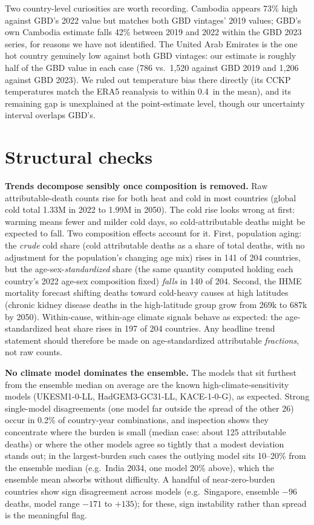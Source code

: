 \documentclass[11pt]{ozreport}
\begin{document}
Two country-level curiosities are worth recording. Cambodia appears 73\%
high against GBD's 2022 value but matches both GBD vintages' 2019 values;
GBD's own Cambodia estimate falls 42\% between 2019 and 2022 within the
GBD 2023 series, for reasons we have not identified. The United Arab
Emirates is the one hot country genuinely low against both GBD vintages:
our estimate is roughly half of the GBD value in each case (786 vs.\ 1{,}520
against GBD 2019 and 1{,}206 against GBD 2023). We ruled out temperature
bias there directly (its CCKP temperatures match the ERA5 reanalysis to
within 0.4\,\textcelsius{} in the mean), and its remaining gap is
unexplained at the point-estimate level, though our uncertainty interval
overlaps GBD's.

\section{Structural checks}

\textbf{Trends decompose sensibly once composition is removed.} Raw
attributable-death counts rise for both heat and cold in most countries
(global cold total 1.33M in 2022 to 1.99M in 2050). The cold rise looks
wrong at first: warming means fewer and milder cold days, so
cold-attributable deaths might be expected to fall. Two composition effects
account for it. First, population aging: the \emph{crude} cold share (cold
attributable deaths as a share of total deaths, with no adjustment for the
population's changing age mix) rises in 141 of 204 countries, but the
age-sex-\emph{standardized} share (the same quantity computed holding each
country's 2022 age-sex composition fixed) \emph{falls} in 140 of 204.
Second, the IHME mortality
forecast shifting deaths toward cold-heavy causes at high latitudes (chronic
kidney disease deaths in the high-latitude group grow from 269k to 687k by
2050). Within-cause, within-age climate signals behave as expected: the
age-standardized heat share rises in 197 of 204 countries. Any headline
trend statement should therefore be made on age-standardized attributable
\emph{fractions}, not raw counts.

\textbf{No climate model dominates the ensemble.} The models that sit
furthest from the ensemble median on average are the known
high-climate-sensitivity models (UKESM1-0-LL, HadGEM3-GC31-LL, KACE-1-0-G),
as expected. Strong single-model disagreements (one model far outside the
spread of the other 26) occur in 0.2\% of country-year combinations, and
inspection shows they concentrate where the burden is small (median case:
about 125 attributable deaths) or where the other models agree so tightly
that a modest deviation stands out; in the largest-burden such cases the
outlying model sits 10--20\% from the ensemble median (e.g.\ India 2034,
one model 20\% above), which the ensemble mean absorbs without difficulty.
A handful of near-zero-burden countries show
sign disagreement across models (e.g.\ Singapore, ensemble $-96$ deaths,
model range $-171$ to $+135$); for these, sign instability rather than
spread is the meaningful flag.
\end{document}
